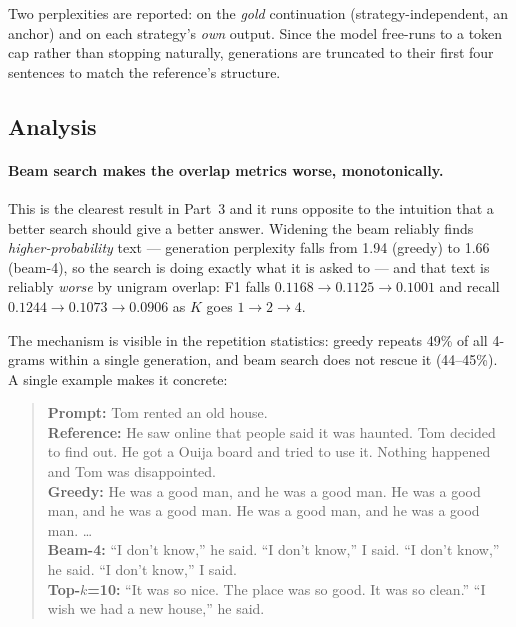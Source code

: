 \documentclass[11pt]{article}
\begin{document}
Two perplexities are reported: on the \emph{gold} continuation
(strategy-independent, an anchor) and on each strategy's \emph{own} output. Since
the model free-runs to a token cap rather than stopping naturally, generations
are truncated to their first four sentences to match the reference's structure.



\subsection{Analysis}

\paragraph{Beam search makes the overlap metrics worse, monotonically.} This is
the clearest result in Part~3 and it runs opposite to the intuition that a better
search should give a better answer. Widening the beam reliably finds
\emph{higher-probability} text --- generation perplexity falls from 1.94 (greedy)
to 1.66 (beam-4), so the search is doing exactly what it is asked to --- and that
text is reliably \emph{worse} by unigram overlap: F1 falls $0.1168 \rightarrow
0.1125 \rightarrow 0.1001$ and recall $0.1244 \rightarrow 0.1073 \rightarrow
0.0906$ as $K$ goes $1 \rightarrow 2 \rightarrow 4$.

The mechanism is visible in the repetition statistics: greedy repeats 49\% of all
4-grams within a single generation, and beam search does not rescue it (44--45\%).
A single example makes it concrete:

\begin{quote}\small
\textbf{Prompt:} Tom rented an old house.\\
\textbf{Reference:} He saw online that people said it was haunted. Tom decided to
find out. He got a Ouija board and tried to use it. Nothing happened and Tom was
disappointed.\\[3pt]
\textbf{Greedy:} He was a good man, and he was a good man. He was a good man, and
he was a good man. He was a good man, and he was a good man. \ldots\\[3pt]
\textbf{Beam-4:} ``I don't know,'' he said. ``I don't know,'' I said. ``I don't
know,'' he said. ``I don't know,'' I said.\\[3pt]
\textbf{Top-$k$=10:} ``It was so nice. The place was so good. It was so clean.''
``I wish we had a new house,'' he said.
\end{quote}
\end{document}
